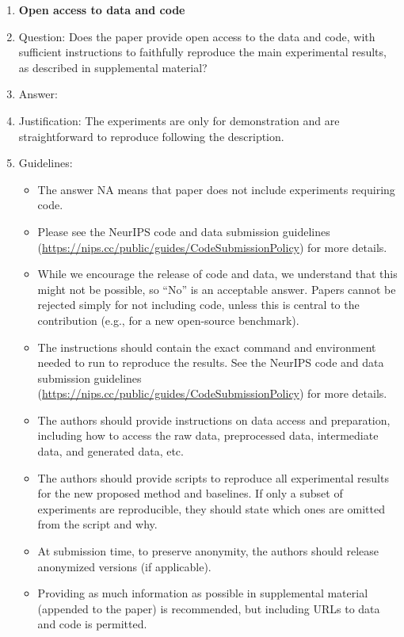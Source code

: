 \documentclass{article}
\theoremstyle{plain}
\begin{document}
\begin{enumerate}
\item {\bf Open access to data and code}
    \item[] Question: Does the paper provide open access to the data and code, with sufficient instructions to faithfully reproduce the main experimental results, as described in supplemental material?
    \item[] Answer: \answerNo{}
    \item[] Justification: The experiments are only for demonstration and are straightforward to reproduce following the description.
    \item[] Guidelines:
    \begin{itemize}
        \item The answer NA means that paper does not include experiments requiring code.
        \item Please see the NeurIPS code and data submission guidelines (\url{https://nips.cc/public/guides/CodeSubmissionPolicy}) for more details.
        \item While we encourage the release of code and data, we understand that this might not be possible, so “No” is an acceptable answer. Papers cannot be rejected simply for not including code, unless this is central to the contribution (e.g., for a new open-source benchmark).
        \item The instructions should contain the exact command and environment needed to run to reproduce the results. See the NeurIPS code and data submission guidelines (\url{https://nips.cc/public/guides/CodeSubmissionPolicy}) for more details.
        \item The authors should provide instructions on data access and preparation, including how to access the raw data, preprocessed data, intermediate data, and generated data, etc.
        \item The authors should provide scripts to reproduce all experimental results for the new proposed method and baselines. If only a subset of experiments are reproducible, they should state which ones are omitted from the script and why.
        \item At submission time, to preserve anonymity, the authors should release anonymized versions (if applicable).
        \item Providing as much information as possible in supplemental material (appended to the paper) is recommended, but including URLs to data and code is permitted.
    \end{itemize}



\end{enumerate}
\end{document}
